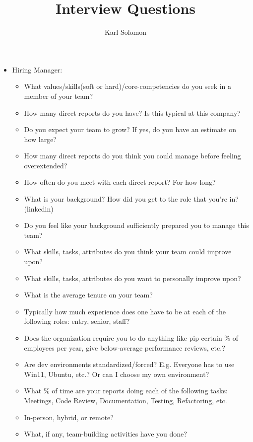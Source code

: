 \documentclass{article}
\begin{document}
\selectfont
\title{Interview Questions}
\author{Karl Solomon}

\maketitle
\small
\begin{itemize}
  \item Hiring Manager:
    \begin{itemize}
      \item What values/skills(soft or hard)/core-competencies do you seek in a member of your team?
      \item How many direct reports do you have? Is this typical at this company?
      \item Do you expect your team to grow? If yes, do you have an estimate on how large?
      \item How many direct reports do you think you could manage before feeling overextended?
      \item How often do you meet with each direct report? For how long?
      \item What is your background? How did you get to the role that you're in? (linkedin)
      \item Do you feel like your background sufficiently prepared you to manage this team?
      \item What skills, tasks, attributes do you think your team could improve upon?
      \item What skills, tasks, attributes do you want to personally improve upon?
      \item What is the average tenure on your team?
      \item Typically how much experience does one have to be at each of the following roles: entry, senior, staff?
      \item Does the organization require you to do anything like pip certain \% of employees per year, give below-average performance reviews, etc.?
      \item Are dev environments standardized/forced? E.g. Everyone has to use Win11, Ubuntu, etc.? Or can I choose my own environment?
      \item What \% of time are your reports doing each of the following tasks: Meetings, Code Review, Documentation, Testing, Refactoring, etc.
      \item In-person, hybrid, or remote?
      \item What, if any, team-building activities have you done?

\end{itemize}
\end{itemize}
\end{document}
